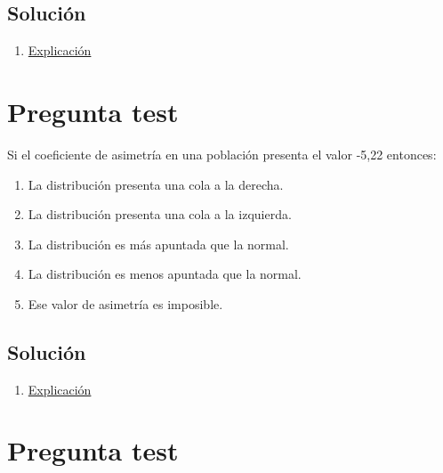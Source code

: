 \documentclass[
]{book}
\providecommand{\tightlist}{%
  \setlength{\itemsep}{0pt}\setlength{\parskip}{0pt}}
\begin{document}
\hypertarget{soluciuxf3n-46}{%
\subsection{Solución}\label{soluciuxf3n-46}}

\begin{enumerate}
\def\labelenumi{\alph{enumi})}
\setcounter{enumi}{3}
\tightlist
\item
  \href{https://1fjmanzano.github.io/bioestadistica/medidas-de-forma.html}{Explicación}
\end{enumerate}

\hypertarget{pregunta-test-45}{%
\section{Pregunta test}\label{pregunta-test-45}}

Si el coeficiente de asimetría en una población presenta el valor -5,22 entonces:

\begin{enumerate}
\def\labelenumi{\alph{enumi})}
\tightlist
\item
  La distribución presenta una cola a la derecha.
\item
  La distribución presenta una cola a la izquierda.
\item
  La distribución es más apuntada que la normal.
\item
  La distribución es menos apuntada que la normal.
\item
  Ese valor de asimetría es imposible.
\end{enumerate}

\hypertarget{soluciuxf3n-47}{%
\subsection{Solución}\label{soluciuxf3n-47}}

\begin{enumerate}
\def\labelenumi{\alph{enumi})}
\setcounter{enumi}{1}
\tightlist
\item
  \href{https://1fjmanzano.github.io/bioestadistica/medidas-de-forma.html}{Explicación}
\end{enumerate}

\hypertarget{pregunta-test-46}{%
\section{Pregunta test}\label{pregunta-test-46}}
\end{document}
